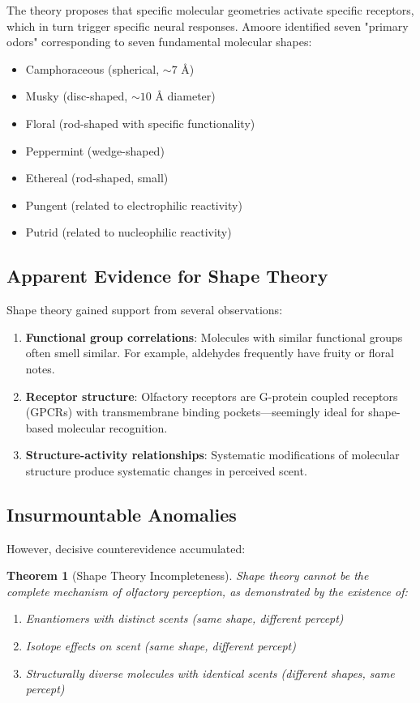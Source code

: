 \documentclass[11pt]{article}
\newtheorem{theorem}{Theorem}[section]
\theoremstyle{remark}
\begin{document}
The theory proposes that specific molecular geometries activate specific receptors, which in turn trigger specific neural responses. Amoore identified seven "primary odors" corresponding to seven fundamental molecular shapes:
\begin{itemize}
\item Camphoraceous (spherical, $\sim 7$ Å)
\item Musky (disc-shaped, $\sim 10$ Å diameter)
\item Floral (rod-shaped with specific functionality)
\item Peppermint (wedge-shaped)
\item Ethereal (rod-shaped, small)
\item Pungent (related to electrophilic reactivity)
\item Putrid (related to nucleophilic reactivity)
\end{itemize}

\subsection{Apparent Evidence for Shape Theory}

Shape theory gained support from several observations:

\begin{enumerate}
\item \textbf{Functional group correlations}: Molecules with similar functional groups often smell similar. For example, aldehydes frequently have fruity or floral notes.

\item \textbf{Receptor structure}: Olfactory receptors are G-protein coupled receptors (GPCRs) with transmembrane binding pockets—seemingly ideal for shape-based molecular recognition.

\item \textbf{Structure-activity relationships}: Systematic modifications of molecular structure produce systematic changes in perceived scent.
\end{enumerate}

\subsection{Insurmountable Anomalies}

However, decisive counterevidence accumulated:

\begin{theorem}[Shape Theory Incompleteness]
\label{thm:shape_incompleteness}
Shape theory cannot be the complete mechanism of olfactory perception, as demonstrated by the existence of:
\begin{enumerate}
\item Enantiomers with distinct scents (same shape, different percept)
\item Isotope effects on scent (same shape, different percept)
\item Structurally diverse molecules with identical scents (different shapes, same percept)
\end{enumerate}
\end{theorem}
\end{document}
